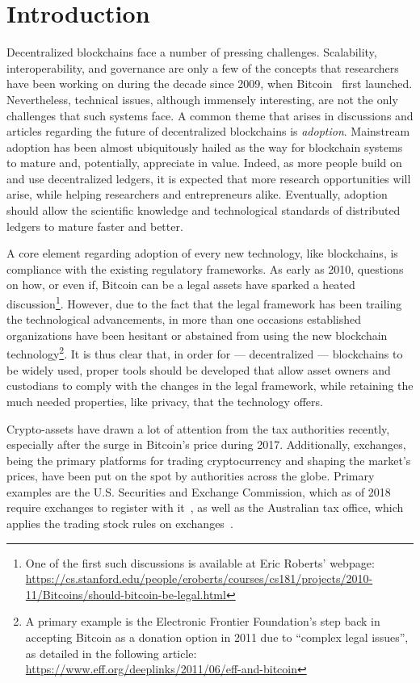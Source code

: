 \section{Introduction}\label{sec:introduction}

Decentralized blockchains face a number of pressing challenges.
Scalability, interoperability, and governance are only a few of the concepts
that researchers have been working on during the decade since 2009, when
Bitcoin~\cite{nakamoto2008bitcoin} first launched. Nevertheless, technical
issues, although immensely interesting, are not the only challenges that such
systems face. A common theme that arises in discussions and articles regarding
the future of decentralized blockchains is \emph{adoption}.
Mainstream adoption has been almost ubiquitously hailed as the way for
blockchain systems to mature and, potentially, appreciate in value. Indeed, as
more people build on and use decentralized ledgers, it is expected that more
research opportunities will arise, while helping researchers and entrepreneurs
alike. Eventually, adoption should allow the scientific knowledge and
technological standards of distributed ledgers to mature faster and better.

A core element regarding adoption of every new technology, like blockchains, is
compliance with the existing regulatory frameworks. As early as 2010, questions
on how, or even if, Bitcoin can be a legal assets have sparked a heated
discussion\footnote{One of the first such discussions is available at Eric
Roberts' webpage:
\url{https://cs.stanford.edu/people/eroberts/courses/cs181/projects/2010-11/Bitcoins/should-bitcoin-be-legal.html}}.
However, due to the fact that the legal framework has been trailing the
technological advancements, in more than one occasions established
organizations have been hesitant or abstained from using the new blockchain
technology\footnote{A primary example is the Electronic Frontier Foundation's
step back in accepting Bitcoin as a donation option in 2011 due to ``complex
legal issues'', as detailed in the following article:
\url{https://www.eff.org/deeplinks/2011/06/eff-and-bitcoin}}. It is thus clear
that, in order for --- decentralized --- blockchains to be widely used, proper
tools should be developed that allow asset owners and custodians to comply with
the changes in the legal framework, while retaining the much needed properties,
like privacy, that the technology offers.

Crypto-assets have drawn a lot of attention from the tax authorities recently,
especially after the surge in Bitcoin's price during 2017. Additionally,
exchanges, being the primary platforms for trading cryptocurrency and shaping
the market's prices, have been put on the spot by authorities across the
globe. Primary examples are the U.S. Securities and Exchange Commission, which
as of 2018 require exchanges to register with
it~\cite{securities2018statement}, as well as the Australian tax office, which
applies the trading stock rules on exchanges~\cite{tax2019statement}.

